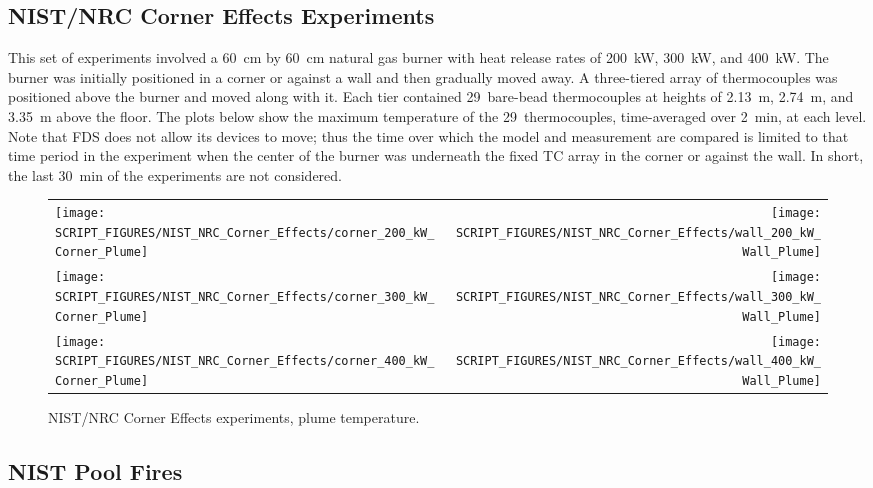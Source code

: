 \clearpage

\subsection{NIST/NRC Corner Effects Experiments}

This set of experiments involved a 60~cm by 60~cm natural gas burner with heat release rates of 200~kW, 300~kW, and 400~kW. The burner was initially positioned in a corner or against a wall and then gradually moved away. A three-tiered array of thermocouples was positioned above the burner and moved along with it. Each tier contained 29~bare-bead thermocouples at heights of 2.13~m, 2.74~m, and 3.35~m above the floor. The plots below show the maximum temperature of the 29~thermocouples, time-averaged over 2~min, at each level. Note that FDS does not allow its devices to move; thus the time over which the model and measurement are compared is limited to that time period in the experiment when the center of the burner was underneath the fixed TC array in the corner or against the wall. In short, the last 30~min of the experiments are not considered.

\begin{figure}[!h]
\begin{tabular*}{\textwidth}{l@{\extracolsep{\fill}}r}
\texttt{[image: SCRIPT\_FIGURES/NIST\_NRC\_Corner\_Effects/corner\_200\_kW\_Corner\_Plume]} &
\texttt{[image: SCRIPT\_FIGURES/NIST\_NRC\_Corner\_Effects/wall\_200\_kW\_Wall\_Plume]} \\
\texttt{[image: SCRIPT\_FIGURES/NIST\_NRC\_Corner\_Effects/corner\_300\_kW\_Corner\_Plume]} &
\texttt{[image: SCRIPT\_FIGURES/NIST\_NRC\_Corner\_Effects/wall\_300\_kW\_Wall\_Plume]} \\
\texttt{[image: SCRIPT\_FIGURES/NIST\_NRC\_Corner\_Effects/corner\_400\_kW\_Corner\_Plume]} &
\texttt{[image: SCRIPT\_FIGURES/NIST\_NRC\_Corner\_Effects/wall\_400\_kW\_Wall\_Plume]}
\end{tabular*}
\caption[NIST/NRC Corner Effects experiments, plume temperature]
{NIST/NRC Corner Effects experiments, plume temperature.}
\label{NIST_NRC_Corner_Plume_Temp}
\end{figure}


\clearpage

\subsection{NIST Pool Fires}
\label{NIST_Pool_Fires_Plume_Temps}

